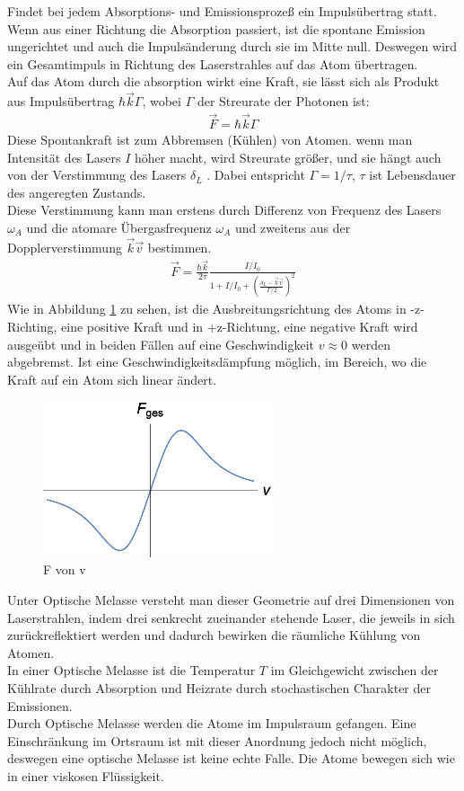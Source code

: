 \documentclass[12pt,a4paper]{article}
\begin{document}
  Findet bei jedem Absorptions- und Emissionsprozeß ein Impulsübertrag statt. Wenn aus einer Richtung die Absorption passiert, ist die spontane Emission ungerichtet und auch die Impulsänderung durch sie im Mitte null. Deswegen wird ein Gesamtimpuls in Richtung des Laserstrahles auf das Atom übertragen.
 \\Auf das Atom durch die absorption wirkt eine Kraft, sie lässt sich als Produkt aus Impulsübertrag ${\hbar \vec k \Gamma}$, wobei ${\Gamma}$ der Streurate der Photonen ist: 
   \begin{align*}
  \vec F=\hbar \vec k \Gamma
  \end{align*}
  Diese Spontankraft ist zum Abbremsen (Kühlen) von Atomen. wenn man Intensität des Lasers ${I}$ höher macht, wird Streurate größer, und sie hängt auch von der Verstimmung des Lasers ${\delta_L}$ . Dabei entspricht ${\Gamma =1/ \tau}$, ${\tau}$ ist Lebensdauer des angeregten Zustands.
  \\Diese Verstimmung kann man erstens durch Differenz von Frequenz des Lasers ${\omega_A}$ und die atomare Übergasfrequenz ${\omega_A}$ und zweitens aus der Dopplerverstimmung ${\vec k \vec v}$ bestimmen.
   \begin{align*}
    \vec F=\frac{\hbar \vec k}{2 \tau} \frac{I/I_0}{1+I/I_0+(\frac{ \delta _L-\vec k \vec v}{\Gamma /2})^2}
  \end{align*}
  Wie in Abbildung \ref{fvonv} zu sehen, ist die Ausbreitungsrichtung des Atoms in -z-Richting, eine positive Kraft und in +z-Richtung, eine negative Kraft wird ausgeübt und in beiden Fällen auf eine Geschwindigkeit ${v\approx 0}$ werden abgebremst. Ist eine Geschwindigkeitsdämpfung möglich, im Bereich, wo die Kraft auf ein Atom sich linear ändert.
   \begin{figure}[h!]
  \centering
  \includegraphics[width=0.6\textwidth]{fvonv.eps}
  \caption{F von v}
  \label{fvonv}
  \end{figure}
  Unter Optische Melasse versteht man dieser Geometrie auf drei Dimensionen von Laserstrahlen, indem drei senkrecht zueinander stehende Laser, die jeweils in sich zurückreflektiert werden und dadurch bewirken die räumliche Kühlung von Atomen.
 \\In einer Optische Melasse ist die Temperatur ${T}$ im Gleichgewicht zwischen der Kühlrate durch Absorption und Heizrate durch stochastischen Charakter der Emissionen.
 \\Durch Optische Melasse werden die Atome im Impulsraum gefangen. Eine Einschränkung im Ortsraum ist mit dieser Anordnung jedoch nicht möglich, deswegen eine optische Melasse ist keine echte Falle. Die Atome bewegen sich wie in einer viskosen Flüssigkeit. 
 
\end{document}

